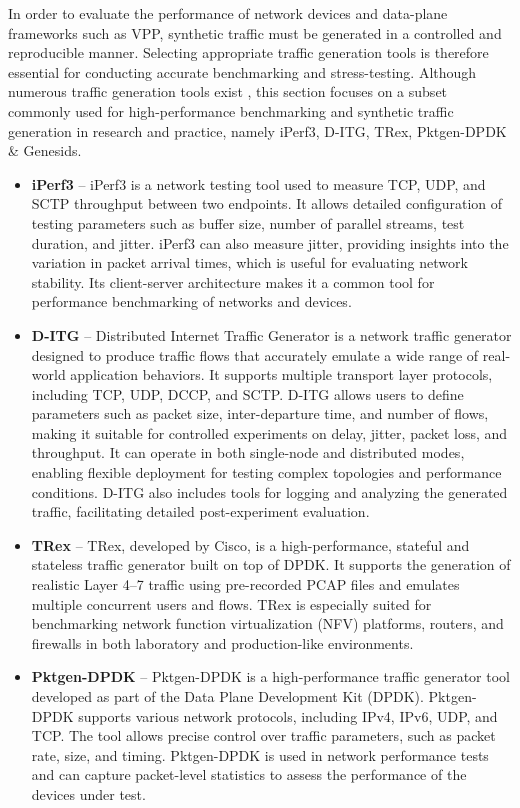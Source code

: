 In order to evaluate the performance of network devices and data-plane frameworks such as VPP, synthetic traffic must be generated in a controlled and reproducible manner. 
Selecting appropriate traffic generation tools is therefore essential for conducting accurate benchmarking and stress-testing. Although numerous traffic generation tools exist \cite{traffic-generators}, 
this section focuses on a subset commonly used for high-performance benchmarking and synthetic traffic generation in research and practice, namely iPerf3, D-ITG, TRex, Pktgen-DPDK \& Genesids. 

\begin{itemize}
  \item \textbf{iPerf3} -- iPerf3 is a network testing tool used to measure TCP, UDP, and SCTP throughput between two endpoints. It allows detailed configuration of testing parameters such as buffer size, number of parallel streams, test duration, and jitter. iPerf3 can also measure jitter, providing insights into the variation in packet arrival times, which is useful for evaluating network stability. Its client-server architecture makes it a common tool for performance benchmarking of networks and devices.\cite{iperf}

  \item \textbf{D-ITG} -- Distributed Internet Traffic Generator is a network traffic generator designed to produce traffic flows that accurately emulate a wide range of real-world application behaviors. It supports multiple transport layer protocols, including TCP, UDP, DCCP, and SCTP. D-ITG allows users to define parameters such as packet size, inter-departure time, and number of flows, making it suitable for controlled experiments on delay, jitter, packet loss, and throughput. It can operate in both single-node and distributed modes, enabling flexible deployment for testing complex topologies and performance conditions. D-ITG also includes tools for logging and analyzing the generated traffic, facilitating detailed post-experiment evaluation.\cite{DITGManual}

  \item \textbf{TRex} -- TRex, developed by Cisco, is a high-performance, stateful and stateless traffic generator built on top of DPDK. It supports the generation of realistic Layer 4–7 traffic using pre-recorded PCAP files and emulates multiple concurrent users and flows. TRex is especially suited for benchmarking network function virtualization (NFV) platforms, routers, and firewalls in both laboratory and production-like environments.\cite{trex} 

\item \textbf{Pktgen-DPDK} -- Pktgen-DPDK is a high-performance traffic generator tool developed as part of the Data Plane Development Kit (DPDK). Pktgen-DPDK supports various network protocols, including IPv4, IPv6, UDP, and TCP. The tool allows precise control over traffic parameters, such as packet rate, size, and timing. Pktgen-DPDK is used in network performance tests and can capture packet-level statistics to assess the performance of the devices under test.\cite{pktgen_dpdk} 
\end{itemize}

